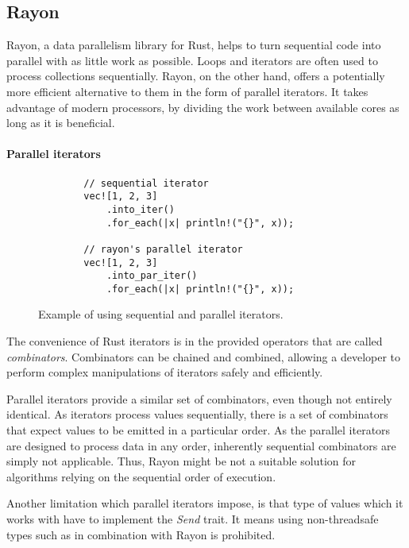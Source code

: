 \subsection{Rayon}
Rayon, a data parallelism library for Rust, helps to turn sequential code into parallel with as little work as possible. Loops and iterators are often used to process collections sequentially. Rayon, on the other hand, offers a potentially more efficient alternative to them in the form of parallel iterators. It takes advantage of modern processors, by dividing the work between available cores as long as it is beneficial.

\paragraph{Parallel iterators}
\begin{figure}[!htbp]
    \centering

    \begin{verbatim}
        // sequential iterator
        vec![1, 2, 3]
            .into_iter()
            .for_each(|x| println!("{}", x));

        // rayon's parallel iterator
        vec![1, 2, 3]
            .into_par_iter()
            .for_each(|x| println!("{}", x));
    \end{verbatim}

    \caption{Example of using sequential and parallel iterators.}
    \label{fig:par-iter-example}
\end{figure}

The convenience of Rust iterators is in the provided operators that are called \emph{combinators}. Combinators can be chained and combined, allowing a developer to perform complex manipulations of iterators safely and efficiently.

Parallel iterators provide a similar set of combinators, even though not entirely identical. As iterators process values sequentially, there is a set of combinators that expect values to be emitted in a particular order. As the parallel iterators are designed to process data in any order, inherently sequential combinators are simply not applicable. Thus, Rayon might be not a suitable solution for algorithms relying on the sequential order of execution.

Another limitation which parallel iterators impose, is that type of values which it works with have to implement the \emph{Send} trait. It means using non-threadsafe types such as \rc{} in combination with Rayon is prohibited.


